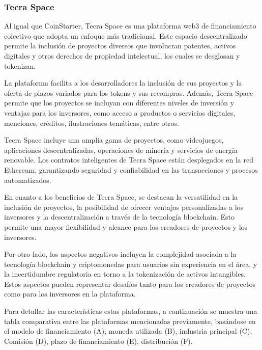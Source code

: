 \newpage

\subsubsection{Tecra Space}

Al igual que CoinStarter, Tecra Space es una plataforma web3 de financiamiento colectivo que adopta un enfoque más tradicional. Este espacio descentralizado permite la inclusión de proyectos diversos que involucran patentes, activos digitales y otros derechos de propiedad intelectual, los cuales se desglosan y tokenizan.

\bigskip

La plataforma facilita a los desarrolladores la inclusión de sus proyectos y la oferta de plazos variados para los tokens y sus recompras. Además, Tecra Space permite que los proyectos se incluyan con diferentes niveles de inversión y ventajas para los inversores, como acceso a productos o servicios digitales, menciones, créditos, ilustraciones temáticas, entre otros.

\bigskip

Tecra Space incluye una amplia gama de proyectos, como videojuegos, aplicaciones descentralizadas, operaciones de minería y servicios de energía renovable. Los contratos inteligentes de Tecra Space están desplegados en la red Ethereum, garantizando seguridad y confiabilidad en las transacciones y procesos automatizados.

\bigskip

En cuanto a los beneficios de Tecra Space, se destacan la versatilidad en la inclusión de proyectos, la posibilidad de ofrecer ventajas personalizadas a los inversores y la descentralización a través de la tecnología blockchain. Esto permite una mayor flexibilidad y alcance para los creadores de proyectos y los inversores.

\bigskip

Por otro lado, los aspectos negativos incluyen la complejidad asociada a la tecnología blockchain y criptomonedas para usuarios sin experiencia en el área, y la incertidumbre regulatoria en torno a la tokenización de activos intangibles. Estos aspectos pueden representar desafíos tanto para los creadores de proyectos como para los inversores en la plataforma.

\newpage

Para detallar las características estas plataformas, a continuación se muestra una tabla comparativa entre las plataformas mencionadas previamente, basándose en el modelo de financiamiento (A), moneda utilizada (B), industria principal (C),  Comisión (D), plazo de financiamiento (E), distribución (F).

